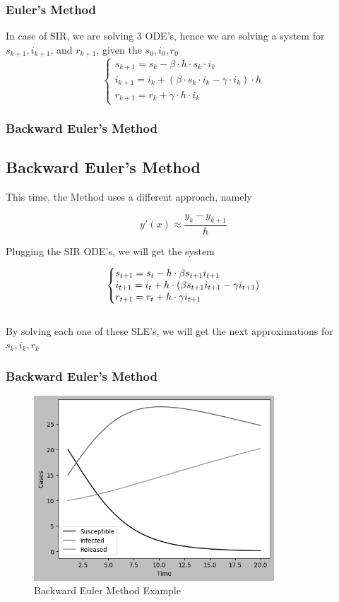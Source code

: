 \documentclass{beamer}
\makeatletter
\newenvironment{system}%
{\left\lbrace\begin{array}{@{}l@{}}}%
{\end{array}\right.}
\makeatother
\begin{document}
\begin{frame}\frametitle{Euler's Method}
In case of SIR, we are solving 3 ODE's, hence we are solving a system
for $s_{k+1}, i_{k+1}$, and $r_{k+1}$, given the $s_0, i_0, r_0$
\vspace{0.7cm}
\Large
\[
	\left\{
		\begin{array}{l}
			s_{k+1}=s_k - \beta \cdot h \cdot s_k \cdot i_k \\
			i_{k+1}=i_k + (\beta \cdot s_k \cdot i_k - \gamma \cdot i_k) \cdot h \\
			r_{k+1}=r_k+ \gamma \cdot h \cdot i_k
		\end{array}
	\right.
\]
\end{frame}

\begin{frame}\frametitle{Backward Euler's Method}
\subsection{Backward Euler's Method}
This time, the Method uses a different approach, namely

\begin{equation*}
	y'(x) \approx \frac{y_k-y_{k+1}}{h}
\end{equation*}

Plugging the SIR ODE's, we will get the system

    \begin{equation*}
        \begin{system}
        s_{t+1} = s_t - h \cdot \beta s_{t+1} i_{t+1}
        \\
        i_{t+1} = i_t + h \cdot (\beta s_{t+1} i_{t+1} - \gamma i_{t+1})
        \\
        r_{t+1}= r_t + h\cdot \gamma i_{t+1}
        \end{system}
    \end{equation*}
    \vspace{0.3cm}
\\
    By solving each one of these SLE's, we will get the next approximations for $s_k,i_k,r_k$
\end{frame}

\begin{frame}\frametitle{Backward Euler's Method}
    \begin{figure}
        \caption{Backward Euler Method Example}
        \centering
        \includegraphics[width=9cm]{Figure_BackwardsEuler.png}
    \end{figure}
\end{frame}
\end{document}

